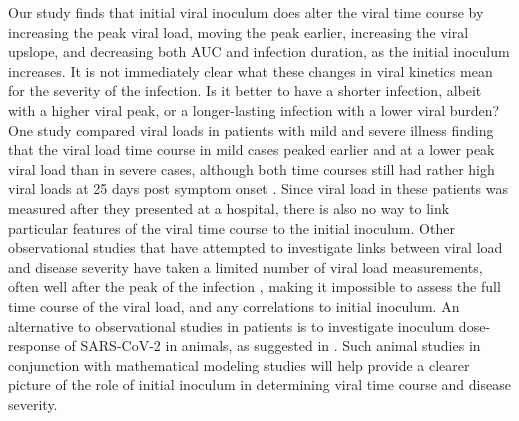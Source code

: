 Our study finds that initial viral inoculum does alter the viral time course by increasing the peak viral load, moving the peak earlier, increasing the viral upslope, and decreasing both AUC and infection duration, as the initial inoculum increases. It is not immediately clear what these changes in viral kinetics mean for the severity of the infection. Is it better to have a shorter infection, albeit with a higher viral peak, or a longer-lasting infection with a lower viral burden? One study compared viral loads in patients with mild and severe illness finding that the viral load time course in mild cases peaked earlier and at a lower peak viral load than in severe cases, although both time courses still had rather high viral loads at 25 days post symptom onset \cite{zheng20}. Since viral load in these patients was measured after they presented at a hospital, there is also no way to link particular features of the viral time course to the initial inoculum. Other observational studies that have attempted to investigate links between viral load and disease severity have taken a limited number of viral load measurements, often well after the peak of the infection \cite{liu20, liu20imm,to20}, making it impossible to assess the full time course of the viral load, and any correlations to initial inoculum. An alternative to observational studies in patients is to investigate inoculum dose-response of SARS-CoV-2 in animals, as suggested in \cite{little20}. Such animal studies in conjunction with mathematical modeling studies will help provide a clearer picture of the role of initial inoculum in determining viral time course and disease severity.



